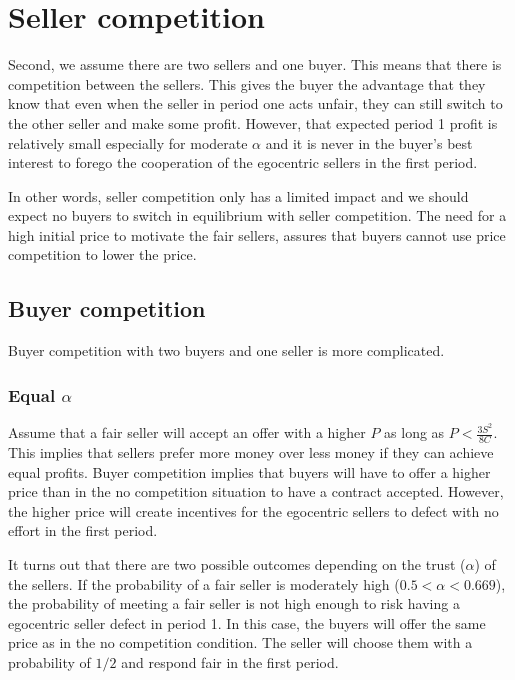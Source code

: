 \documentclass{article}
\begin{document}
\section{Seller competition}

Second, we assume there are two sellers and one buyer. This means that there is competition between the sellers. This gives the buyer the advantage that they know that even when the seller in period one acts unfair, they can still switch to the other seller and make some profit. However, that expected period 1 profit is relatively small especially for moderate $\alpha$ and it is never in the buyer's best interest to forego the cooperation of the egocentric sellers in the first period. 

In other words, seller competition only has a limited impact and we should expect no buyers to switch in equilibrium with seller competition. The need for a high initial price to motivate the fair sellers, assures that buyers cannot use price competition to lower the price. 

\subsection{Buyer competition}

Buyer competition with two buyers and one seller is more complicated. 

\subsubsection{Equal $\alpha$}

Assume that a fair seller will accept an offer with a higher $P$ as long as $P < \frac{3S^2}{8C}$. This implies that sellers prefer more money over less money if they can achieve equal profits. Buyer competition implies that buyers will have to offer a higher price than in the no competition situation to have a contract accepted. However, the higher price will create incentives for the egocentric sellers to defect with no effort in the first period.

It turns out that there are two possible outcomes depending on the trust ($\alpha$) of the sellers. If the probability of a fair seller is moderately high ($0.5 < \alpha < 0.669$), the probability of meeting a fair seller is not high enough to risk having a egocentric seller defect in period 1. In this case, the buyers will offer the same price as in the no competition condition. The seller will choose them with a probability of $1/2$ and respond fair in the first period. 
\end{document}
